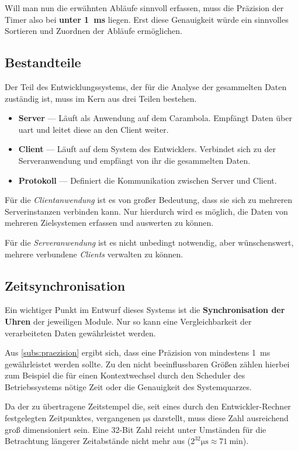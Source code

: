 Will man nun die erwähnten Abläufe sinnvoll erfassen, muss die Präzision der
Timer also bei \textbf{unter \SI{1}{\milli\second}} liegen. Erst diese
Genauigkeit würde ein sinnvolles Sortieren und Zuordnen der Abläufe ermöglichen.

\subsection{Bestandteile}\label{subs:best}
Der Teil des Entwicklungssystems, der für die Analyse der gesammelten Daten
zuständig ist, muss im Kern aus drei Teilen bestehen.
\begin{itemize}
  \item \textbf{Server} --- Läuft als Anwendung auf dem Carambola. Empfängt
  Daten über \gls{uart} und leitet diese an den Client weiter.
  \item \textbf{Client} --- Läuft auf dem System des Entwicklers. Verbindet sich
  zu der Serveranwendung und empfängt von ihr die gesammelten Daten.
  \item \textbf{Protokoll} --- Definiert die Kommunikation zwischen Server und
  Client.
\end{itemize}
Für die \emph{Clientanwendung} ist es von großer Bedeutung, dass sie sich zu
mehreren Serverinstanzen verbinden kann. Nur hierdurch wird es möglich, die
Daten von mehreren Zielsystemen erfassen und auswerten zu können.

Für die \emph{Serveranwendung} ist es nicht unbedingt notwendig, aber
wünschenswert, mehrere verbundene \emph{Clients} verwalten zu können.
\subsection{Zeitsynchronisation}\label{subs:time}
Ein wichtiger Punkt im Entwurf dieses Systems ist die \textbf{Synchronisation
der Uhren} der jeweiligen Module. Nur so kann eine Vergleichbarkeit der
verarbeiteten Daten gewährleistet werden.

Aus \autoref{subs:praezision} ergibt sich, dass eine Präzision von mindestens
\SI{1}{\milli\second} gewährleistet werden sollte. Zu den nicht beeinflussbaren
Größen zählen hierbei zum Beispiel die für einen Kontextwechsel durch den
Scheduler des Betriebssystems nötige Zeit oder die Genauigkeit des
Systemquarzes.

Da der zu übertragene Zeitstempel die, seit eines durch den Entwickler-Rechner
festgelegten Zeitpunktes, vergangenen $\si{\micro\second}$ darstellt, muss diese
Zahl ausreichend groß dimensioniert sein. Eine 32-Bit Zahl reicht unter
Umständen für die Betrachtung längerer Zeitabstände nicht mehr aus
($2^{32}\si{\micro\second}\approx \SI{71}{\minute}$).


